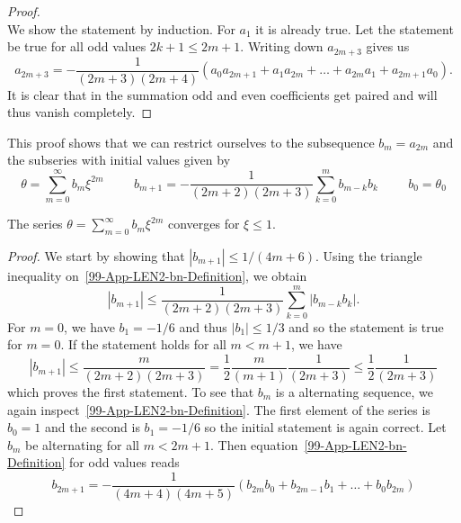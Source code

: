 \begin{appendix}
\begin{section}
\begin{proof}
\begin{equation}
	\end{equation}
	We show the statement by induction. 
	For $a_1$ it is already true.
	Let the statement be true for all odd values $2k+1\leq2m+1$. 
	Writing down $a_{2m+3}$ gives us
	\begin{equation}
		a_{2m+3} = -\frac{1}{(2m+3)(2m+4)}\left(a_0a_{2m+1}+a_1a_{2m}+\dots+a_{2m}a_1+a_{2m+1}a_0\right).
	\end{equation}
	It is clear that in the summation odd and even coefficients get paired and will thus 
	vanish completely.
\end{proof}\noindent
This proof shows that we can restrict ourselves to the subsequence $b_m=a_{2m}$ and 
the subseries with initial values given by
\begin{equation}
	\theta = \sum\limits_{m=0}^\infty b_m\xi^{2m} \hspace{1cm} b_{m+1} = 
	-\frac{1}{(2m+2)(2m+3)}\sum\limits_{k=0}^mb_{m-k}b_k \hspace{1cm} b_0=\theta_0
	\label{99-App-LEN2-bn-Definition}
\end{equation}
\begin{theorem}
	The series $\theta=\sum\limits_{m=0}^\infty b_m\xi^{2m}$ converges for $\xi\leq1$.
\end{theorem}
\begin{proof}
	We start by showing that $|b_{m+1}|\leq1/(4m+6)$.
	Using the triangle inequality on~\ref{99-App-LEN2-bn-Definition}, we obtain
	\begin{equation}
		|b_{m+1}| \leq \frac{1}{(2m+2)(2m+3)}\sum\limits_{k=0}^m|b_{m-k}b_k|.
	\end{equation}
	For $m=0$, we have $b_1=-1/6$ and thus $|b_1|\leq1/3$ and so the statement is true for $m=0$.
	If the statement holds for all $m<m+1$, we have
	\begin{equation}
		|b_{m+1}| \leq \frac{m}{(2m+2)(2m+3)} = \frac{1}{2}\frac{m}{(m+1)}\frac{1}{(2m+3)}
		\leq\frac{1}{2}\frac{1}{(2m+3)}
	\end{equation}
	which proves the first statement.
	To see that $b_m$ is a alternating sequence, we again inspect~\ref{99-App-LEN2-bn-Definition}.
	The first element of the series is $b_0=1$ and the second is $b_1=-1/6$ so the initial statement is again correct.
	Let $b_m$ be alternating for all $m<2m+1$.
	Then equation~\ref{99-App-LEN2-bn-Definition} for odd values reads
	\begin{equation}
		b_{2m+1} = -\frac{1}{(4m+4)(4m+5)}\left(b_{2m}b_0+b_{2m-1}b_1+\dots+b_0b_{2m}\right)
	\end{equation}

\end{proof}
\end{section}
\end{appendix}
